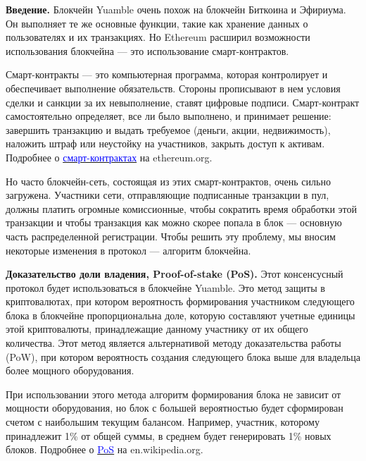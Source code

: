 \documentclass[11pt]{article}
\begin{document}
\vspace{1\baselineskip}
\begin{multicols}{2}
	
\textbf{Введение.}
Блокчейн Yuamble очень похож на блокчейн Биткоина и Эфириума. Он выполняет те же основные функции, такие как хранение данных о пользователях и их транзакциях. Но Ethereum расширил возможности использования блокчейна — это использование смарт-контрактов.

Смарт-контракты — это компьютерная программа, которая контролирует и обеспечивает выполнение обязательств. Стороны прописывают в нем условия сделки и санкции за их невыполнение, ставят цифровые подписи. Смарт-контракт самостоятельно определяет, все ли было выполнено, и принимает решение: завершить транзакцию и выдать требуемое (деньги, акции, недвижимость), наложить штраф или неустойку на участников, закрыть доступ к активам. Подробнее о \href{https://ethereum.org/en/developers/docs/smart-contracts}{\textcolor{blue}{смарт-контрактах}} на ethereum.org.

Но часто блокчейн-сеть, состоящая из этих смарт-контрактов, очень сильно загружена. Участники сети, отправляющие подписанные транзакции в пул, должны платить огромные комиссионные, чтобы сократить время обработки этой транзакции и чтобы транзакция как можно скорее попала в блок — основную часть распределенной регистрации. Чтобы решить эту проблему, мы вносим некоторые изменения в протокол — алгоритм блокчейна.

\vspace{1\baselineskip}
\textbf{Доказательство доли владения, Proof-of-stake (PoS).}
Этот консенсусный протокол будет использоваться в блокчейне Yuamble. Это метод защиты в криптовалютах, при котором вероятность формирования участником следующего блока в блокчейне пропорциональна доле, которую составляют учетные единицы этой криптовалюты, принадлежащие данному участнику от их общего количества. Этот метод является альтернативой методу доказательства работы (PoW), при котором вероятность создания следующего блока выше для владельца более мощного оборудования.

При использовании этого метода алгоритм формирования блока не зависит от мощности оборудования, но блок с большей вероятностью будет сформирован счетом с наибольшим текущим балансом. Например, участник, которому принадлежит 1\% от общей суммы, в среднем будет генерировать 1\% новых блоков. Подробнее о \href{https://en.wikipedia.org/wiki/Proof_of_stake }{\textcolor{blue}{PoS}} на en.wikipedia.org.


\end{multicols}
\end{document}
